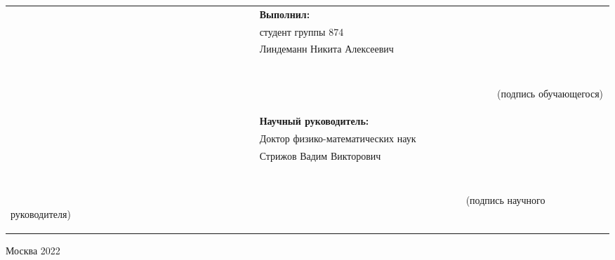 \begin{titlepage}
	\begin{flushright}
		\begin{table}[!ht]
			\centering
			\begin{tabular}{l}
				~~~~~~~~~~~~~~~~~~~~~~~~~~~~~~~~~~~~~~~~~~~~~~~~~~ \textbf{Выполнил:}\\
				~~~~~~~~~~~~~~~~~~~~~~~~~~~~~~~~~~~~~~~~~~~~~~~~~~ студент группы 874\\
				~~~~~~~~~~~~~~~~~~~~~~~~~~~~~~~~~~~~~~~~~~~~~~~~~~ Линдеманн Никита Алексеевич\\
				~~~~~~~~~~~~~~~~~~~~~~~~~~~~~~~~~~~~~~~~~~~~~~~~~~ \underline{\hspace{7cm}}\\[-10pt]
				\begin{scriptsize}
	    			~~~~~~~~~~~~~~~~~~~~~~~~~~~~~~~~~~~~~~~~~~~~~~~~~~~~~~~~~~~~~~~~~~~~~~~~~~~~~~~~~~~~~~~~~~~~~~~~~~\,
	    			(подпись обучающегося)
	   		 	\end{scriptsize}\\[15pt]
				~~~~~~~~~~~~~~~~~~~~~~~~~~~~~~~~~~~~~~~~~~~~~~~~~~ \textbf{Научный руководитель:}\\
				~~~~~~~~~~~~~~~~~~~~~~~~~~~~~~~~~~~~~~~~~~~~~~~~~~ Доктор физико-математических наук\\
				~~~~~~~~~~~~~~~~~~~~~~~~~~~~~~~~~~~~~~~~~~~~~~~~~~ Стрижов Вадим Викторович\\
				~~~~~~~~~~~~~~~~~~~~~~~~~~~~~~~~~~~~~~~~~~~~~~~~~~ \underline{\hspace{7cm}}\\[-10pt]
				\begin{scriptsize}
					~~~~~~~~~~~~~~~~~~~~~~~~~~~~~~~~~~~~~~~~~~~~~~~~~~~~~~~~~~~~~~~~~~~~~~~~~~~~~~~~~~~~~~~~~~~~
	    			(подпись научного руководителя)
	    		\end{scriptsize}
	    	\end{tabular}
	    \end{table}
	\end{flushright}


	\begin{center}
		Москва 2022
	\end{center}

\end{titlepage}


